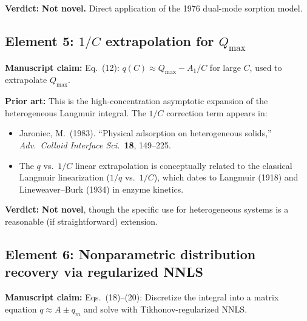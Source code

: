 \documentclass[12pt]{article}
\begin{document}
\textbf{Verdict:} \textbf{Not novel.}  Direct application of the 1976
dual-mode sorption model.

\subsection{Element 5: $1/C$ extrapolation for $Q_{\max}$}

\textbf{Manuscript claim:} Eq.~(12): $q(C)\approx Q_{\max}-A_1/C$ for
large $C$, used to extrapolate $Q_{\max}$.

\textbf{Prior art:} This is the high-concentration asymptotic expansion
of the heterogeneous Langmuir integral.  The $1/C$ correction term
appears in:
\begin{itemize}[nosep]
  \item Jaroniec, M.\ (1983). ``Physical adsorption on heterogeneous
        solids,'' \textit{Adv.\ Colloid Interface Sci.}\ \textbf{18},
        149--225.
  \item The $q$ vs.\ $1/C$ linear extrapolation is conceptually related
        to the classical Langmuir linearization ($1/q$ vs.\ $1/C$), which
        dates to Langmuir (1918) and Lineweaver--Burk (1934) in enzyme
        kinetics.
\end{itemize}

\textbf{Verdict:} \textbf{Not novel}, though the specific use for
heterogeneous systems is a reasonable (if straightforward) extension.

\subsection{Element 6: Nonparametric distribution recovery via regularized NNLS}

\textbf{Manuscript claim:} Eqs.~(18)--(20): Discretize the integral into a matrix equation $q\approx A\pm{q}_m$ and solve with Tikhonov-regularized NNLS.
\end{document}
